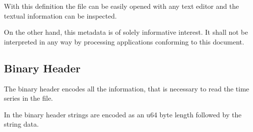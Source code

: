 \documentclass[DIV=10]{scrartcl}
\begin{document}
With this definition the file can be easily opened with any text editor and the textual information can be inspected.

On the other hand, this metadata is of solely informative interest.
It shall not be interpreted in any way by processing applications conforming to this document.

\subsection{Binary Header}

The binary header encodes all the information, that is necessary to read the time series in the file.

In the binary header strings are encoded as an u64 byte length followed by the string data.
\end{document}
